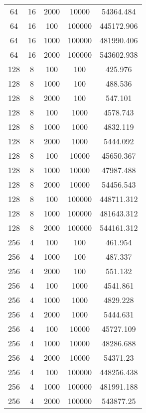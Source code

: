 \documentclass[../main.tex]{subfiles}
\begin{document}
\begin{longtable}{|c|c|c|c|c|}
64      & 16      & 2000 & 10000  & 54364.484  \\
64      & 16      & 100  & 100000 & 445172.906 \\
64      & 16      & 1000 & 100000 & 481990.406 \\
64      & 16      & 2000 & 100000 & 543602.938 \\
128     & 8       & 100  & 100    & 425.976    \\
128     & 8       & 1000 & 100    & 488.536    \\
128     & 8       & 2000 & 100    & 547.101    \\
128     & 8       & 100  & 1000   & 4578.743   \\
128     & 8       & 1000 & 1000   & 4832.119   \\
128     & 8       & 2000 & 1000   & 5444.092   \\
128     & 8       & 100  & 10000  & 45650.367  \\
128     & 8       & 1000 & 10000  & 47987.488  \\
128     & 8       & 2000 & 10000  & 54456.543  \\
128     & 8       & 100  & 100000 & 448711.312 \\
128     & 8       & 1000 & 100000 & 481643.312 \\
128     & 8       & 2000 & 100000 & 544161.312 \\
256     & 4       & 100  & 100    & 461.954    \\
256     & 4       & 1000 & 100    & 487.337    \\
256     & 4       & 2000 & 100    & 551.132    \\
256     & 4       & 100  & 1000   & 4541.861   \\
256     & 4       & 1000 & 1000   & 4829.228   \\
256     & 4       & 2000 & 1000   & 5444.631   \\
256     & 4       & 100  & 10000  & 45727.109  \\
256     & 4       & 1000 & 10000  & 48286.688  \\
256     & 4       & 2000 & 10000  & 54371.23   \\
256     & 4       & 100  & 100000 & 448256.438 \\
256     & 4       & 1000 & 100000 & 481991.188 \\
256     & 4       & 2000 & 100000 & 543877.25  \\ \hline
\end{longtable}
\end{document}

